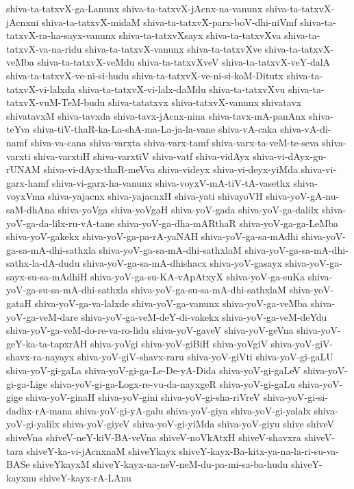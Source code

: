 {shiva-ta-tatxvX-ga-Lanunx
shiva-ta-tatxvX-jAcnx-na-vanunx
shiva-ta-tatxvX-jAcnxni
shiva-ta-tatxvX-midaM
shiva-ta-tatxvX-parx-boV-dhi-niVmf
shiva-ta-tatxvX-ra-ha-sayx-vanunx
shiva-ta-tatxvXsayx
shiva-ta-tatxvXva
shiva-ta-tatxvX-va-na-ridu
shiva-ta-tatxvX-vanunx
shiva-ta-tatxvXve
shiva-ta-tatxvX-veMba
shiva-ta-tatxvX-veMdu
shiva-ta-tatxvXveV
shiva-ta-tatxvX-veY-dalA
shiva-ta-tatxvX-ve-ni-si-hudu
shiva-ta-tatxvX-ve-ni-si-koM-Ditutx
shiva-ta-tatxvX-vi-lalxda
shiva-ta-tatxvX-vi-lalx-daMdu
shiva-ta-tatxvXvu
shiva-ta-tatxvX-vuM-TeM-budu
shiva-tatatxvx
shiva-tatxvX-vanunx
shivatavx
shivatavxM
shiva-tavxda
shiva-tavx-jAcnx-nina
shiva-tavx-mA-panAnx
shiva-teYva
shiva-tiV-thaR-ka-La-shA-ma-La-ja-la-vane
shiva-vA-caka
shiva-vA-di-namf
shiva-va-cana
shiva-varxta
shiva-varx-tamf
shiva-varx-ta-veM-te-seva
shiva-varxti
shiva-varxtiH
shiva-varxtiV
shiva-vatf
shiva-vidAyx
shiva-vi-dAyx-gu-rUNAM
shiva-vi-dAyx-thaR-meVva
shiva-videyx
shiva-vi-deyx-yiMda
shiva-vi-garx-hamf
shiva-vi-garx-ha-vanunx
shiva-voyxV-mA-tiV-tA-vasethx
shiva-voyxVma
shiva-yajacnx
shiva-yajacnxH
shiva-yati
shivayoVH
shiva-yoV-gA-nu-saM-dhAna
shiva-yoVga
shiva-yoVgaH
shiva-yoV-gada
shiva-yoV-ga-dalilx
shiva-yoV-ga-da-lilx-ru-vA-tane
shiva-yoV-ga-dha-mARthaR
shiva-yoV-ga-ga-LeMba
shiva-yoV-gakekx
shiva-yoV-ga-pa-rA-yaNAH
shiva-yoV-ga-sa-mAdhi
shiva-yoV-ga-sa-mA-dhi-sathxla
shiva-yoV-ga-sa-mA-dhi-sathxlaM
shiva-yoV-ga-sa-mA-dhi-sathx-la-dA-dudu
shiva-yoV-ga-sa-mA-dhishacx
shiva-yoV-gasayx
shiva-yoV-ga-sayx-su-sa-mAdhiH
shiva-yoV-ga-su-KA-vApAtxyX
shiva-yoV-ga-suKa
shiva-yoV-ga-su-sa-mA-dhi-sathxla
shiva-yoV-ga-su-sa-mA-dhi-sathxlaM
shiva-yoV-gataH
shiva-yoV-ga-va-lalxde
shiva-yoV-ga-vanunx
shiva-yoV-ga-veMba
shiva-yoV-ga-veM-dare
shiva-yoV-ga-veM-deY-di-vakekx
shiva-yoV-ga-veM-deYdu
shiva-yoV-ga-veM-do-re-va-ro-lidu
shiva-yoV-gaveV
shiva-yoV-geVna
shiva-yoV-geY-ka-ta-tapxrAH
shiva-yoVgi
shiva-yoV-giBiH
shiva-yoVgiV
shiva-yoV-giV-shavx-ra-nayayx
shiva-yoV-giV-shavx-raru
shiva-yoV-giVti
shiva-yoV-gi-gaLU
shiva-yoV-gi-gaLa
shiva-yoV-gi-ga-Le-De-yA-Dida
shiva-yoV-gi-gaLeV
shiva-yoV-gi-ga-Lige
shiva-yoV-gi-ga-Logx-re-vu-da-nayxgeR
shiva-yoV-gi-gaLu
shiva-yoV-gige
shiva-yoV-ginaH
shiva-yoV-gini
shiva-yoV-gi-sha-riVreV
shiva-yoV-gi-si-dadhx-rA-mana
shiva-yoV-gi-yA-galu
shiva-yoV-giya
shiva-yoV-gi-yalalx
shiva-yoV-gi-yalilx
shiva-yoV-giyeV
shiva-yoV-gi-yiMda
shiva-yoV-giyu
shive
shiveV
shiveVna
shiveV-neY-kiV-BA-veVna
shiveV-noVkAtxH
shiveV-shavxra
shiveV-tara
shiveY-ka-vi-jAcnxnaM
shiveYkayx
shiveY-kayx-Ba-kitx-ya-na-la-ri-su-va-BASe
shiveYkayxM
shiveY-kayx-na-neV-neM-du-pa-mi-sa-ba-hudu
shiveY-kayxnu
shiveY-kayx-rA-LAnu
}
